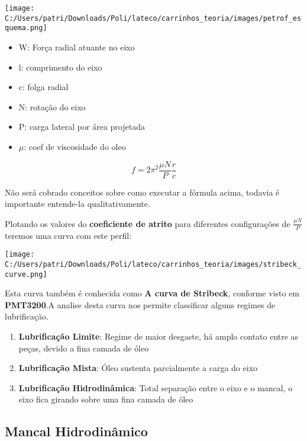 \begin{center}
\texttt{[image: C:/Users/patri/Downloads/Poli/lateco/carrinhos\_teoria/images/petrof\_esquema.png]}\\
\end{center}

\begin{itemize}
	\item W: Força radial atuante no eixo
	\item l: comprimento do eixo
	\item c: folga radial
	\item N: rotação do eixo
	\item P: carga lateral por área projetada
	\item $\mu$: coef de viscosidade do oleo    
\end{itemize}

\begin{equation}
	f = 2\pi^2 \frac{\mu N}{P}\frac{r}{c}
\end{equation}

Não será cobrado conceitos sobre como executar a fórmula acima, todavia é importante entende-la qualitativamente.

Plotando os valores do \textbf{coeficiente de atrito} para diferentes configurações de $\frac{\mu N}{P}$ teremos uma curva com este perfil:

\begin{center}
\texttt{[image: C:/Users/patri/Downloads/Poli/lateco/carrinhos\_teoria/images/stribeck\_curve.png]}\\
\end{center}

Esta curva também é conhecida como \textbf{A curva de Stribeck}, conforme visto em \textbf{PMT3200}.A analise desta curva nos permite classificar alguns regimes de lubrificação.

\begin{enumerate}
	\item \textbf{Lubrificação Limite}: Regime de maior desgaste, há amplo contato entre as peças, devido a fina camada de óleo
	\item \textbf{Lubrificação Mista}: Óleo sustenta parcialmente a carga do eixo
	\item \textbf{Lubrificação Hidrodinâmica}: Total separação entre o eixo e o mancal, o eixo fica girando sobre uma fina camada de óleo
\end{enumerate}

\subsection{Mancal Hidrodinâmico}

